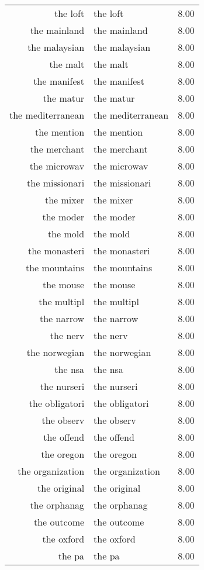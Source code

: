\begin{table}[ht]
\begin{tabular}{rlr}
  the loft & the loft & 8.00 \\ 
  the mainland & the mainland & 8.00 \\ 
  the malaysian & the malaysian & 8.00 \\ 
  the malt & the malt & 8.00 \\ 
  the manifest & the manifest & 8.00 \\ 
  the matur & the matur & 8.00 \\ 
  the mediterranean & the mediterranean & 8.00 \\ 
  the mention & the mention & 8.00 \\ 
  the merchant & the merchant & 8.00 \\ 
  the microwav & the microwav & 8.00 \\ 
  the missionari & the missionari & 8.00 \\ 
  the mixer & the mixer & 8.00 \\ 
  the moder & the moder & 8.00 \\ 
  the mold & the mold & 8.00 \\ 
  the monasteri & the monasteri & 8.00 \\ 
  the mountains & the mountains & 8.00 \\ 
  the mouse & the mouse & 8.00 \\ 
  the multipl & the multipl & 8.00 \\ 
  the narrow & the narrow & 8.00 \\ 
  the nerv & the nerv & 8.00 \\ 
  the norwegian & the norwegian & 8.00 \\ 
  the nsa & the nsa & 8.00 \\ 
  the nurseri & the nurseri & 8.00 \\ 
  the obligatori & the obligatori & 8.00 \\ 
  the observ & the observ & 8.00 \\ 
  the offend & the offend & 8.00 \\ 
  the oregon & the oregon & 8.00 \\ 
  the organization & the organization & 8.00 \\ 
  the original & the original & 8.00 \\ 
  the orphanag & the orphanag & 8.00 \\ 
  the outcome & the outcome & 8.00 \\ 
  the oxford & the oxford & 8.00 \\ 
  the pa & the pa & 8.00 \\ 

\end{tabular}
\end{table}
